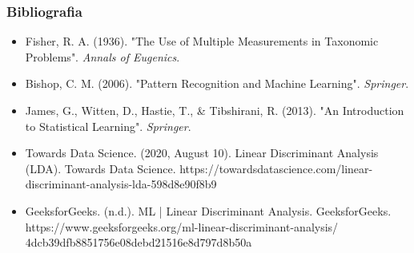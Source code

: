 \documentclass{beamer}
\begin{document}
\begin{frame}
    \frametitle{Bibliografia}
    \begin{itemize}
        \item Fisher, R. A. (1936). "The Use of Multiple Measurements in Taxonomic Problems". \textit{Annals of Eugenics}.
        \item Bishop, C. M. (2006). "Pattern Recognition and Machine Learning". \textit{Springer}.
        \item James, G., Witten, D., Hastie, T., \& Tibshirani, R. (2013). "An Introduction to Statistical Learning". \textit{Springer}.

        \item Towards Data Science. (2020, August 10). Linear Discriminant Analysis (LDA). Towards Data Science. https://towardsdatascience.com/linear-discriminant-analysis-lda-598d8e90f8b9
        \item GeeksforGeeks. (n.d.). ML | Linear Discriminant Analysis. GeeksforGeeks. https://www.geeksforgeeks.org/ml-linear-discriminant-analysis/
		4dcb39dfb8851756e08debd21516e8d797d8b50a
    \end{itemize}
\end{frame}
\end{document}
